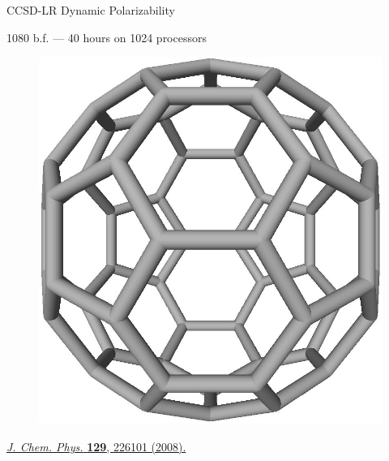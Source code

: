 \documentclass[11pt]{beamer}
\begin{document}
  \begin{frame}{CCSD-LR Dynamic Polarizability} \Large
    \begin{normalsize}
        1080 b.f. --- 40 hours on 1024 processors
    \end{normalsize}
    \begin{figure}
    \includegraphics[scale=0.18,angle=90]{c60.jpg}
    \end{figure}
    \begin{center}\begin{tiny}
        \href{http://link.aip.org/link/jcpsa6/v129/i22/p226101/s1}{\textit{J. Chem. Phys.} \textbf{129}, 226101 (2008).}
    \end{tiny}\end{center}
  \end{frame}
\end{document}
